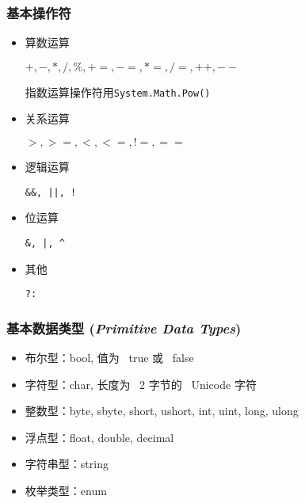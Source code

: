 \begin{frame}
\frametitle{基本操作符}
\begin{itemize}
\item 算数运算 \par
\texttt{$+,-,*,/,\%, +=,-=,*=,/=,++,--$}\par
指数运算操作符用\texttt{System.Math.Pow()}
\item 关系运算 \par
\texttt{$>, >=, <, <=, !=, ==$}
\item 逻辑运算 \par
\texttt{\&\&, ||, !}
\item 位运算 \par
\texttt{\&, |, \^}
\item 其他 \par
\texttt{?:}
\end{itemize}

\end{frame}


\begin{frame}
\frametitle{基本数据类型  (\textit{Primitive Data Types})}
\begin{itemize}
    \setlength{\itemsep}{8pt plus 1pt}
\item 布尔型：bool, 值为~ true 或~ false
\item 字符型：char, 长度为~ 2 字节的 ~Unicode 字符
\item 整数型：byte, sbyte, short, ushort, int, uint, long, ulong
\item 浮点型：float, double, decimal
\item 字符串型：string
\item 枚举类型：enum
\end{itemize}
\end{frame}


